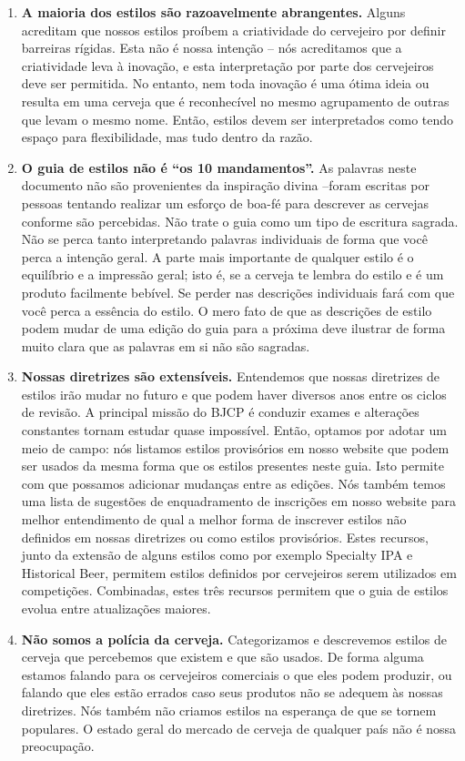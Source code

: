 \begin{enumerate}
\item \textbf{A maioria dos estilos são razoavelmente abrangentes.} Alguns acreditam que nossos estilos proíbem a criatividade do cervejeiro por definir barreiras rígidas. Esta não é nossa intenção – nós acreditamos que a criatividade leva à inovação, e esta interpretação por parte dos cervejeiros deve ser permitida. No entanto, nem toda inovação é uma ótima ideia ou resulta em uma cerveja que é reconhecível no mesmo agrupamento de outras que levam o mesmo nome. Então, estilos devem ser interpretados como tendo espaço para flexibilidade, mas tudo dentro da razão.
\item \textbf{O guia de estilos não é “os 10 mandamentos”.} As palavras neste documento não são provenientes da inspiração divina –foram escritas por pessoas tentando realizar um esforço de boa-fé para descrever as cervejas conforme são percebidas. Não trate o guia como um tipo de escritura sagrada. Não se perca tanto interpretando palavras individuais de forma que você perca a intenção geral. A parte mais importante de qualquer estilo é o equilíbrio e a impressão geral; isto é, se a cerveja te lembra do estilo e é um produto facilmente bebível. Se perder nas descrições individuais fará com que você perca a essência do estilo. O mero fato de que as descrições de estilo podem mudar de uma edição do guia para a próxima deve ilustrar de forma muito clara que as palavras em si não são sagradas.
\item \textbf{Nossas diretrizes são extensíveis.} Entendemos que nossas diretrizes de estilos irão mudar no futuro e que podem haver diversos anos entre os ciclos de revisão. A principal missão do BJCP é conduzir exames e alterações constantes tornam estudar quase impossível. Então, optamos por adotar um meio de campo: nós listamos estilos provisórios em nosso website que podem ser usados da mesma forma que os estilos presentes neste guia. Isto permite com que possamos adicionar mudanças entre as edições. Nós também temos uma lista de sugestões de enquadramento de inscrições em nosso website para melhor entendimento de qual a melhor forma de inscrever estilos não definidos em nossas diretrizes ou como estilos provisórios. Estes recursos, junto da extensão de alguns estilos como por exemplo Specialty IPA e Historical Beer, permitem estilos definidos por cervejeiros serem utilizados em competições.  Combinadas, estes três recursos permitem que o guia de estilos evolua entre atualizações maiores.
\item \textbf{Não somos a polícia da cerveja.} Categorizamos e descrevemos estilos de cerveja que percebemos que existem e que são usados. De forma alguma estamos falando para os cervejeiros comerciais o que eles podem produzir, ou falando que eles estão errados caso seus produtos não se adequem às nossas diretrizes. Nós também não criamos estilos na esperança de que se tornem populares. O estado geral do mercado de cerveja de qualquer país não é nossa preocupação.

\end{enumerate}
